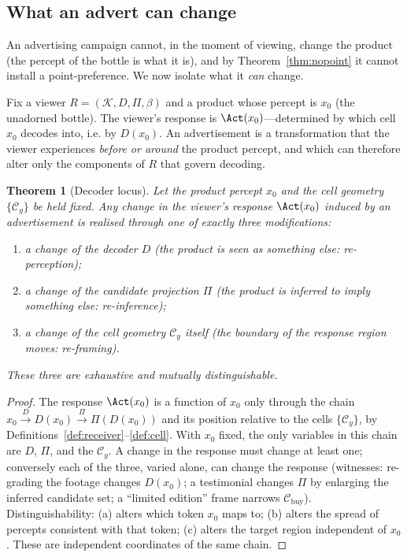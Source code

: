 \documentclass[twocolumn,11pt,a4paper]{article}
\theoremstyle{adv}
\newtheorem{theorem}{Theorem}[section]
\theoremstyle{definition}
\theoremstyle{remark}
\newcommand{\Know}{\mathcal{K}}        %
\newcommand{\Cell}{\mathcal{C}}        %
\newcommand{\Dec}{D}                   %
\newcommand{\Proj}{\Pi}                %
\newcommand{\Recv}{R}                  %
\newcommand{\floor}{\beta}            %
\begin{document}
\subsection{What an advert can change}

An advertising campaign cannot, in the moment of viewing, change the
product (the percept of the bottle is what it is), and by
Theorem~\ref{thm:nopoint} it cannot install a point-preference. We now
isolate what it \emph{can} change.

Fix a viewer $\Recv=(\Know,\Dec,\Proj,\floor)$ and a product whose percept
is $x_0$ (the unadorned bottle). The viewer's response is
$\Act(x_0)$---determined by which cell $x_0$ decodes into, i.e. by
$\Dec(x_0)$. An advertisement is a transformation that the viewer
experiences \emph{before or around} the product percept, and which can
therefore alter only the components of $\Recv$ that govern decoding.

\begin{theorem}[Decoder locus]
\label{thm:decoderlocus}
Let the product percept $x_0$ and the cell geometry $\{\Cell_y\}$ be held
fixed. Any change in the viewer's response $\Act(x_0)$ induced by an
advertisement is realised through one of exactly three modifications:
\begin{enumerate}[label=(\alph*),leftmargin=1.8em,itemsep=1pt]
\item a change of the decoder $\Dec$ (the product is \emph{seen as}
  something else: re-perception);
\item a change of the candidate projection $\Proj$ (the product is
  \emph{inferred to imply} something else: re-inference);
\item a change of the cell geometry $\Cell_y$ itself (the boundary of the
  response region moves: re-framing).
\end{enumerate}
These three are exhaustive and mutually distinguishable.
\end{theorem}

\begin{proof}
The response $\Act(x_0)$ is a function of $x_0$ only through the chain
$x_0 \xrightarrow{\Dec} \Dec(x_0)\xrightarrow{\Proj}\Proj(\Dec(x_0))$ and
its position relative to the cells $\{\Cell_y\}$, by
Definitions~\ref{def:receiver}--\ref{def:cell}. With $x_0$ fixed, the only
variables in this chain are $\Dec$, $\Proj$, and the $\Cell_y$. A change in
the response must change at least one; conversely each of the three, varied
alone, can change the response (witnesses: re-grading the footage changes
$\Dec(x_0)$; a testimonial changes $\Proj$ by enlarging the inferred
candidate set; a ``limited edition'' frame narrows $\Cell_{\text{buy}}$).
Distinguishability: (a) alters which token $x_0$ maps to; (b) alters the
spread of percepts consistent with that token; (c) alters the target
region independent of $x_0$. These are independent coordinates of the same
chain.
\end{proof}
\end{document}
